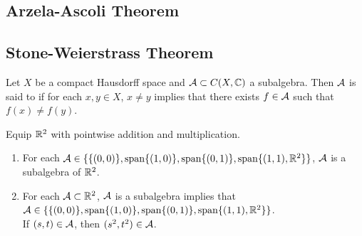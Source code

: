\documentclass{book}
\begin{document}
	
	
	
	
	
	
	
	
	
	
	
	
	
	
	
	
	
	
	
	
	
	
	
	
	
	
	
	
\subsection{Arzela-Ascoli Theorem}



































\subsection{Stone-Weierstrass Theorem}
	
\begin{defn}
	Let $X$ be a compact Hausdorff space and $\mathcal{A} \subset C(X, \mathbb{C})$ a subalgebra. Then $\mathcal{A}$ is said to  if for each $x,y \in X$, $x \neq y$ implies that there exists $f \in \mathcal{A}$ such that $f(x) \neq f(y)$. 
\end{defn}

\begin{ex}
	Equip $\mathbb{R}^2$ with pointwise addition and multiplication. 
	\begin{enumerate}
		\item For each $\mathcal{A} \in \{ \{(0,0)\}, \operatorname{span} \{(1, 0)\}, \operatorname{span} \{(0,1)\}, \operatorname{span}\{ (1,1), \mathbb{R}^2 \} \}$, $\mathcal{A}$ is a subalgebra of $\mathbb{R}^2$. 
		\item For each $\mathcal{A} \subset \mathbb{R}^2$, $\mathcal{A}$ is a subalgebra implies that $\mathcal{A} \in \{ \{(0,0)\}, \operatorname{span} \{(1, 0)\}, \operatorname{span} \{(0,1)\}, \operatorname{span}\{ (1,1), \mathbb{R}^2 \} \}$. \\
		 If $(s,t) \in \mathcal{A}$, then $(s^2, t^2) \in \mathcal{A}$. 
	\end{enumerate}
\end{ex}
\end{document}
